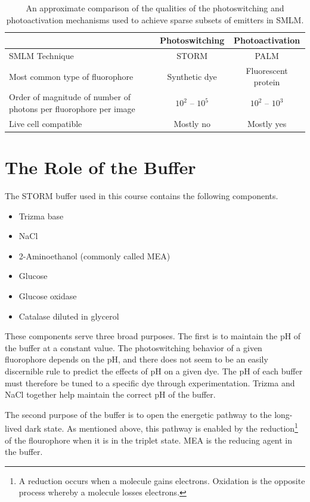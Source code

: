 \documentclass[10pt,a4paper,oneside]{book}
\begin{document}
\begin{table}
    \centering
    \begin{tabular}{ |p{4cm}|c|c| } 
        \hline
        & Photoswitching & Photoactivation \\
        \hline 
        SMLM Technique & STORM & PALM \\
        \hline
        Most common type of fluorophore & Synthetic dye & Fluorescent protein \\
        \hline
        Order of magnitude of number of photons per fluorophore per image & $10^2$ -- $10^5$ & $10^2$ -- $10^3$ \\
        \hline
        Live cell compatible & Mostly no & Mostly yes \\
        \hline
    \end{tabular}
    \caption{An approximate comparison of the qualities of the photoswitching and photoactivation mechanisms used to achieve sparse subsets of emitters in SMLM.}
    \label{table:photophysics-comparison}
\end{table}

\section{The Role of the Buffer}

The STORM buffer used in this course contains the following components.

\begin{itemize}
    \item Trizma base
    \item NaCl
    \item 2-Aminoethanol (commonly called MEA)
    \item Glucose
    \item Glucose oxidase
    \item Catalase diluted in glycerol
\end{itemize}

These components serve three broad purposes. The first is to maintain the pH of the buffer at a constant value. The photoswitching behavior of a given fluorophore depends on the pH, and there does not seem to be an easily discernible rule to predict the effects of pH on a given dye. The pH of each buffer must therefore be tuned to a specific dye through experimentation. Trizma and NaCl together help maintain the correct pH of the buffer.

The second purpose of the buffer is to open the energetic pathway to the long-lived dark state. As mentioned above, this pathway is enabled by the reduction\footnote{A reduction occurs when a molecule gains electrons. Oxidation is the opposite process whereby a molecule losses electrons.} of the flourophore when it is in the triplet state. MEA is the reducing agent in the buffer.
\end{document}
